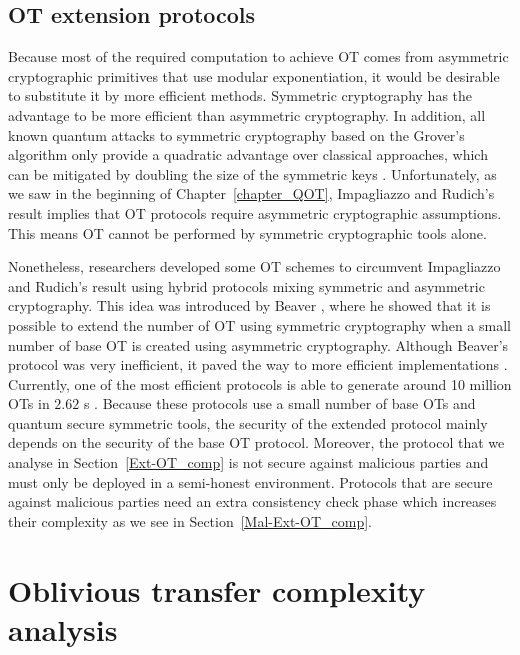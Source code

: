 \subsection{OT extension protocols} \label{Ext-OT}

Because most of the required computation to achieve OT comes from asymmetric cryptographic primitives that use modular exponentiation, it would be desirable to substitute it by more efficient methods. Symmetric cryptography has the advantage to be more efficient than asymmetric cryptography. In addition, all known quantum attacks to symmetric cryptography based on the Grover's algorithm only provide a quadratic advantage over classical approaches, which can be mitigated by doubling the size of the symmetric keys \cite{Bernstein2017}. Unfortunately, as we saw in the beginning of Chapter~\ref{chapter_QOT}, Impagliazzo and Rudich's result \cite{IR99} implies that OT protocols require asymmetric cryptographic assumptions. This means OT cannot be performed by symmetric cryptographic tools alone.

Nonetheless, researchers developed some OT schemes to circumvent Impagliazzo and Rudich's result using hybrid protocols mixing symmetric and asymmetric cryptography. This idea was introduced by Beaver \cite{B96}, where he showed that it is possible to extend the number of OT using symmetric cryptography when a small number of base OT is created using asymmetric cryptography. Although Beaver's protocol was very inefficient, it paved the way to more efficient implementations \cite{IKNP03, N07, NNOB12, ALSZ13, ALSZ15}. Currently, one of the most efficient protocols is able to generate around 10 million OTs in $2.62$ s \cite{ALSZ13}. Because these protocols use a small number of base OTs and quantum secure symmetric tools, the security of the extended protocol mainly depends on the security of the base OT protocol. Moreover, the protocol that we analyse in Section~\ref{Ext-OT_comp} \cite{ALSZ13} is not secure against malicious parties and must only be deployed in a semi-honest environment. Protocols that are secure against malicious parties need an extra consistency check phase which increases their complexity \cite{ALSZ15, KOS15} as we see in Section~\ref{Mal-Ext-OT_comp}.



\section{Oblivious transfer complexity analysis} \label{HQOT_comp}

